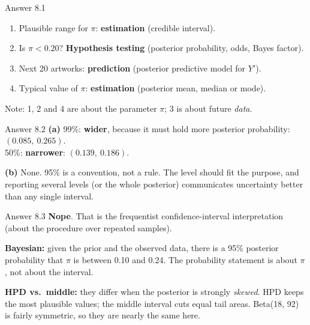 \documentclass[aspectratio=43,11pt]{beamer}
\begin{document}
\begin{frame}{Answer 8.1}
  \begin{enumerate}
    \item Plausible range for $\pi$: \textbf{estimation}
      (credible interval).
    \item Is $\pi < 0.20$? \textbf{Hypothesis testing}
      (posterior probability, odds, Bayes factor).
    \item Next 20 artworks: \textbf{prediction}
      (posterior predictive model for $Y'$).
    \item Typical value of $\pi$: \textbf{estimation}
      (posterior mean, median or mode).
  \end{enumerate}
  \vspace{0.4em}
  Note: 1, 2 and 4 are about the parameter $\pi$; 3 is about future
  \emph{data}.
\end{frame}

\begin{frame}{Answer 8.2}
  \textbf{(a)} 99\%: \textbf{wider}, because it must hold more posterior
  probability: $(0.085,\ 0.265)$. \\
  50\%: \textbf{narrower}: $(0.139,\ 0.186)$.
  \vspace{0.6em}

  \textbf{(b)} None. 95\% is a convention, not a rule. The level should fit
  the purpose, and reporting several levels (or the whole posterior)
  communicates uncertainty better than any single interval.
\end{frame}
\begin{frame}{Answer 8.3}
  \textbf{Nope}. That is the frequentist confidence-interval
  interpretation (about the procedure over repeated samples).
  \vspace{0.4em}

  \textbf{Bayesian:} given the prior and the observed data, there is a
  95\% posterior probability that $\pi$ is between 0.10 and 0.24.
  The probability statement is about $\pi$, not about the interval.
  \vspace{0.4em}

  \textbf{HPD vs.\ middle:} they differ when the posterior is strongly
  \emph{skewed}. HPD keeps the most plausible values; the middle interval
  cuts equal tail areas. Beta(18, 92) is fairly symmetric, so they are
  nearly the same here.
\end{frame}
\end{document}
